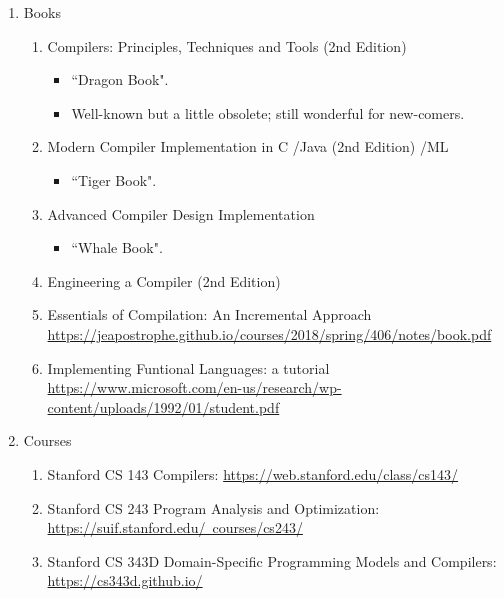 \documentclass{article}
\begin{document}
\begin{enumerate}
    \item Books
    \begin{enumerate}
        \item Compilers: Principles, Techniques and Tools (2nd Edition) \cite{aho2007compilers}
        \begin{itemize}
            \item ``Dragon Book".
            \item Well-known but a little obsolete; still wonderful for new-comers.
        \end{itemize}
        \item Modern Compiler Implementation in C \cite{appel2004modern}/Java (2nd Edition) \cite{appel2003modern}/ML \cite{appel1998modern}
        \begin{itemize}
            \item ``Tiger Book".
        \end{itemize}
        \item Advanced Compiler Design Implementation \cite{muchnick1997advanced}
        \begin{itemize}
            \item ``Whale Book".
        \end{itemize}
        \item Engineering a Compiler (2nd Edition) \cite{cooper2011engineering}    
        \item Essentials of Compilation: An Incremental Approach\\
            \href{https://jeapostrophe.github.io/courses/2018/spring/406/notes/book.pdf}{https://jeapostrophe.github.io/courses/2018/spring/406/notes/book.pdf}
        \item Implementing Funtional Languages: a tutorial\\
        \href{https://www.microsoft.com/en-us/research/wp-content/uploads/1992/01/student.pdf}{https://www.microsoft.com/en-us/research/wp-content/uploads/1992/01/student.pdf}
    \end{enumerate}
    
    \item Courses
    \begin{enumerate}
        \item Stanford CS 143 Compilers:
        \href{https://web.stanford.edu/class/cs143/}{https://web.stanford.edu/class/cs143/}
        \item Stanford CS 243 Program Analysis and Optimization:\\
        \href{https://suif.stanford.edu/~courses/cs243/}{https://suif.stanford.edu/~courses/cs243/}
        \item Stanford CS 343D Domain-Specific Programming Models and Compilers:\\
        \href{https://cs343d.github.io/}{https://cs343d.github.io/}
    \end{enumerate}


\end{enumerate}
\end{document}
